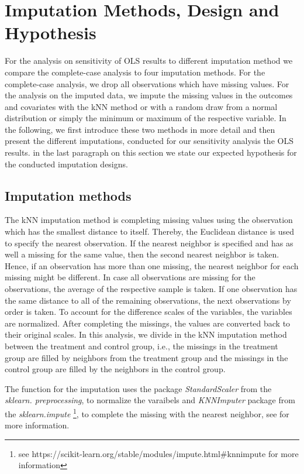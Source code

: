 \section{Imputation Methods, Design and Hypothesis}
\label{sec:imputation_method}

For the analysis on sensitivity of \ac{OLS} results to different imputation method we compare the complete-case analysis to four imputation methods. For the complete-case analysis, we drop all observations which have missing values. For the analysis on the imputed data, we impute the missing values in the outcomes and covariates with the \ac{kNN} method or with a random draw from a normal distribution or simply the minimum or maximum of the respective variable. In the following, we first introduce these two methods in more detail and then present the different imputations, conducted for our sensitivity analysis the \ac{OLS} results. in the last paragraph on this section we state our expected hypothesis for the conducted imputation designs.

\subsection{Imputation methods}
The \ac{kNN} imputation method is completing missing values using the observation which has the smallest distance to itself. Thereby, the Euclidean distance is used to specify the nearest observation. If the nearest neighbor is specified and has as well a missing for the same value, then the second nearest neighbor is taken. Hence, if an observation has more than one missing, the nearest neighbor for each missing might be different. In case all observations are missing for the observations, the average of the respective sample is taken. If one observation has the same distance to all of the remaining observations, the next observations by order is taken. To account for the difference scales of the variables, the variables are normalized. After completing the missings, the values are converted back to their original scales. In this analysis, we divide in the \ac{kNN} imputation method between the treatment and control group, i.e., the missings in the treatment group are filled by neighbors from the treatment group and the missings in the control group are filled by the neighbors in the control group.

The function for the imputation uses the package \textit{StandardScaler} from the \textit{sklearn.
preprocessing}, to normalize the varaibels and \textit{KNNImputer} package from the \textit{sklearn.impute} \footnote{see https://scikit-learn.org/stable/modules/impute.html\#knnimpute for more information}, to complete the missing with the nearest neighbor, see \textcite{troyanskaya2001missing} for more information.

